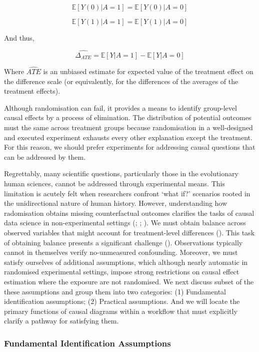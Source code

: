 \documentclass[
  singlecolumn,
  9pt]{article}
\begin{document}
\[
 \mathbb{E}[Y(0) | A = 1] = \mathbb{E}[Y(0) | A = 0] 
\]

\[
\mathbb{E}[Y(1) | A = 1] = \mathbb{E}[Y(1) | A = 0] 
\]

And thus,

\[
  \widehat{\Delta_{ATE}} = \mathbb{E}[Y | A = 1] - \mathbb{E}[Y | A = 0]
\]

Where \(\widehat{ATE}\) is an unbiased estimate for expected value of
the treatment effect on the difference scale (or equivalently, for the
differences of the averages of the treatment effects).

Although randomisation can fail, it provides a means to identify
group-level causal effects by a process of elimination. The distribution
of potential outcomes must the same across treatment groups because
randomisation in a well-designed and executed experiment exhausts every
other explanation except the treatment. For this reason, we should
prefer experiments for addressing causal questions that can be addressed
by them.

Regrettably, many scientific questions, particularly those in the
evolutionary human sciences, cannot be addressed through experimental
means. This limitation is acutely felt when researchers confront `what
if?' scenarios rooted in the unidirectional nature of human history.
However, understanding how radomisation obtains missing counterfactual
outcomes clarifies the tasks of causal data science in non-experimental
settings (;
;
). We must obtain
balance across observed variables that might account for treatment-level
differences ().
This task of obtaining balance presents a significant challenge
(). Observations
typically cannot in themselves verify no-unmeasured confounding.
Moreover, we must satisfy ourselves of additional assumptions, which
although nearly automatic in randomised experimental settings, impose
strong restrictions on causal effect estimation where the exposure are
not randomised. We next discuss subset of the these assumptions and
group them into two categories: (1) Fundamental identification
assumptions; (2) Practical assumptions. And we will locate the primary
functions of causal diagrams within a workflow that must explicitly
clarify a pathway for satisfying them.

\subsubsection{Fundamental Identification
Assumptions}\label{fundamental-identification-assumptions}
\end{document}
